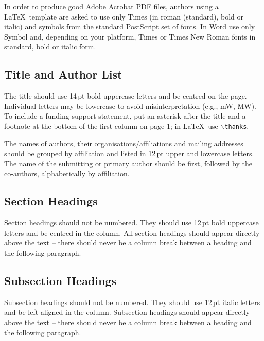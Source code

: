 \documentclass{JAC2003}
\begin{document}
In order to produce good Adobe Acrobat PDF files, 
authors using a \LaTeX\ template are asked to use only Times (in roman (standard), bold or
italic) and symbols from  the standard PostScript set of
fonts. In Word use only Symbol and, depending on your platform, Times or Times New Roman fonts in standard, bold or italic form. 


\subsection{Title and Author List}

The title should use 14\,pt bold uppercase letters and be centred on the page.
Individual letters may be lowercase to avoid misinterpretation (e.g., mW, MW).
To include a funding support statement, put an asterisk after the title and a
footnote at the bottom of the first column on page 1; in \LaTeX\ use
$\backslash$\texttt{thanks}.
  
The names of authors, their organisations/affiliations and mailing addresses 
should be grouped by affiliation and listed in 12\,pt upper and lowercase letters.
The name of the submitting or primary author should be first, followed by 
the co-authors, alphabetically by affiliation.


\subsection{Section Headings}

Section headings should not be numbered. They should
use  12\,pt  bold  uppercase  letters  and  be  centred  in  the
column. All section headings should appear directly above
the text -- there should never be a column break between a heading and the
following paragraph.

\subsection{Subsection Headings}

Subsection  headings  should  not  be  numbered.  They
should use 12\,pt italic letters and be left aligned in the
column. Subsection headings should appear
directly above the text -- there should never be a column break between a
heading and the following paragraph.
\end{document}
